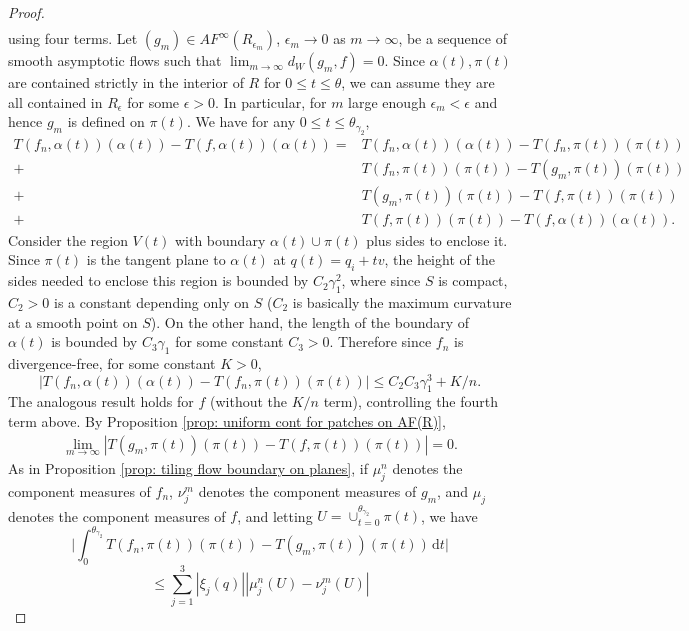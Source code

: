 \documentclass[11pt]{article}
\theoremstyle{remark}
\theoremstyle{definition}
\newcommand{\dd}{\mathrm{d}}
\begin{document}
\begin{proof}
\begin{align*}
    \end{align*}
    using four terms. Let $(g_m)\in AF^\infty(R_{\epsilon_m})$, $\epsilon_m\to0$ as $m\to \infty$, be a sequence of smooth asymptotic flows such that $\lim_{m\to \infty} d_W(g_m,f) = 0$. Since $\alpha(t),\pi(t)$ are contained strictly in the interior of $R$ for $0\leq t\leq \theta$, we can assume they are all contained in $R_\epsilon$ for some $\epsilon>0$. In particular, for $m$ large enough $\epsilon_m<\epsilon$ and hence $g_m$ is defined on $\pi(t)$. We have for any $0\leq t\leq \theta_{\gamma_2}$, 
    \begin{align*}
         T(f_n,\alpha(t))(\alpha(t))- T(f,\alpha(t))(\alpha(t)) = & T(f_n,\alpha(t))(\alpha(t))- T(f_n,\pi(t))(\pi(t))\\ + & T(f_n,\pi(t))(\pi(t))- T(g_m,\pi(t))(\pi(t)) \\+ & T(g_m,\pi(t))(\pi(t))- T(f,\pi(t))(\pi(t)) \\+&
         T(f,\pi(t))(\pi(t)) - T(f,\alpha(t))(\alpha(t)).
    \end{align*}
    Consider the region $V(t)$ with boundary $\alpha(t)\cup \pi(t)$ plus sides to enclose it. Since $\pi(t)$ is the tangent plane to $\alpha(t)$ at $q(t) = q_i+tv$, the height of the sides needed to enclose this region is bounded by $C_2\gamma_1^2$, where since $S$ is compact, $C_2>0$ is a constant depending only on $S$ ($C_2$ is basically the maximum curvature at a smooth point on $S$). On the other hand, the length of the boundary of $\alpha(t)$ is bounded by $C_3\gamma_1$ for some constant $C_3>0$. Therefore since $f_n$ is divergence-free, for some constant $K>0$,
    \begin{equation}\label{eq: approximation by plane}
        |T(f_n,\alpha(t))(\alpha(t))- T(f_n,\pi(t))(\pi(t))|\leq C_2 C_3 \gamma_1^3 +K/n.
    \end{equation}
    The analogous result holds for $f$ (without the $K/n$ term), controlling the fourth term above. By Proposition \ref{prop: uniform cont for patches on AF(R)}, 
    \begin{align*}
        \lim_{m\to \infty} |T(g_m,\pi(t))(\pi(t))- T(f,\pi(t))(\pi(t))| = 0.
    \end{align*}
    As in Proposition \ref{prop: tiling flow boundary on planes}, if $\mu_j^n$ denotes the component measures of $f_n$, $\nu_j^m$ denotes the component measures of $g_m$, and $\mu_j$ denotes the component measures of $f$, and letting $U= \cup_{t=0}^{\theta_{\gamma_2}} \pi(t)$, we have 
$$        \bigg|\int_{0}^{\theta_{\gamma_2}} T(f_n,\pi(t))(\pi(t))- T(g_m,\pi(t))(\pi(t)) \,\dd t\bigg| $$ $$\leq \sum_{j=1}^3 |\xi_j(q)| |\mu_j^n(U)-\nu_j^m(U)| 
$$
\end{proof}
\end{document}
